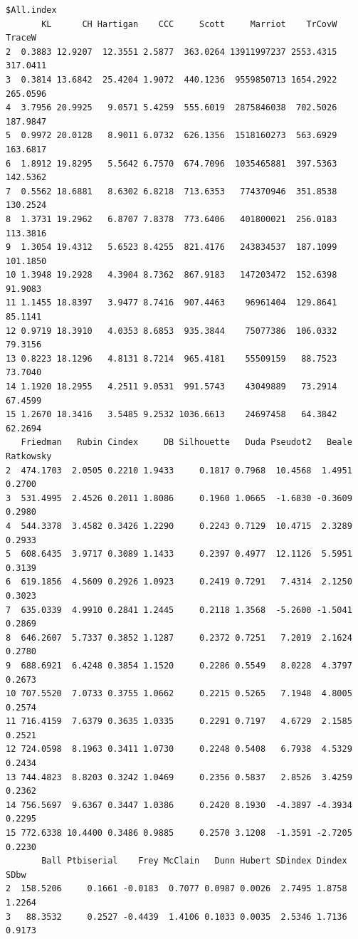\documentclass[
]{article}
\begin{document}
\begin{verbatim}
$All.index
       KL      CH Hartigan    CCC     Scott     Marriot    TrCovW   TraceW
2  0.3883 12.9207  12.3551 2.5877  363.0264 13911997237 2553.4315 317.0411
3  0.3814 13.6842  25.4204 1.9072  440.1236  9559850713 1654.2922 265.0596
4  3.7956 20.9925   9.0571 5.4259  555.6019  2875846038  702.5026 187.9847
5  0.9972 20.0128   8.9011 6.0732  626.1356  1518160273  563.6929 163.6817
6  1.8912 19.8295   5.5642 6.7570  674.7096  1035465881  397.5363 142.5362
7  0.5562 18.6881   8.6302 6.8218  713.6353   774370946  351.8538 130.2524
8  1.3731 19.2962   6.8707 7.8378  773.6406   401800021  256.0183 113.3816
9  1.3054 19.4312   5.6523 8.4255  821.4176   243834537  187.1099 101.1850
10 1.3948 19.2928   4.3904 8.7362  867.9183   147203472  152.6398  91.9083
11 1.1455 18.8397   3.9477 8.7416  907.4463    96961404  129.8641  85.1141
12 0.9719 18.3910   4.0353 8.6853  935.3844    75077386  106.0332  79.3156
13 0.8223 18.1296   4.8131 8.7214  965.4181    55509159   88.7523  73.7040
14 1.1920 18.2955   4.2511 9.0531  991.5743    43049889   73.2914  67.4599
15 1.2670 18.3416   3.5485 9.2532 1036.6613    24697458   64.3842  62.2694
   Friedman   Rubin Cindex     DB Silhouette   Duda Pseudot2   Beale Ratkowsky
2  474.1703  2.0505 0.2210 1.9433     0.1817 0.7968  10.4568  1.4951    0.2700
3  531.4995  2.4526 0.2011 1.8086     0.1960 1.0665  -1.6830 -0.3609    0.2980
4  544.3378  3.4582 0.3426 1.2290     0.2243 0.7129  10.4715  2.3289    0.2933
5  608.6435  3.9717 0.3089 1.1433     0.2397 0.4977  12.1126  5.5951    0.3139
6  619.1856  4.5609 0.2926 1.0923     0.2419 0.7291   7.4314  2.1250    0.3023
7  635.0339  4.9910 0.2841 1.2445     0.2118 1.3568  -5.2600 -1.5041    0.2869
8  646.2607  5.7337 0.3852 1.1287     0.2372 0.7251   7.2019  2.1624    0.2780
9  688.6921  6.4248 0.3854 1.1520     0.2286 0.5549   8.0228  4.3797    0.2673
10 707.5520  7.0733 0.3755 1.0662     0.2215 0.5265   7.1948  4.8005    0.2574
11 716.4159  7.6379 0.3635 1.0335     0.2291 0.7197   4.6729  2.1585    0.2521
12 724.0598  8.1963 0.3411 1.0730     0.2248 0.5408   6.7938  4.5329    0.2434
13 744.4823  8.8203 0.3242 1.0469     0.2356 0.5837   2.8526  3.4259    0.2362
14 756.5697  9.6367 0.3447 1.0386     0.2420 8.1930  -4.3897 -4.3934    0.2295
15 772.6338 10.4400 0.3486 0.9885     0.2570 3.1208  -1.3591 -2.7205    0.2230
       Ball Ptbiserial    Frey McClain   Dunn Hubert SDindex Dindex   SDbw
2  158.5206     0.1661 -0.0183  0.7077 0.0987 0.0026  2.7495 1.8758 1.2264
3   88.3532     0.2527 -0.4439  1.4106 0.1033 0.0035  2.5346 1.7136 0.9173

\end{verbatim}
\end{document}
